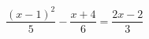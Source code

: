 \begin{ex}
	\begin{condition}
		\( \dfrac{(x-1)^2}{5}-\dfrac{x+4}{6}=\dfrac{2x-2}{3} \)
	\end{condition}
\end{ex}